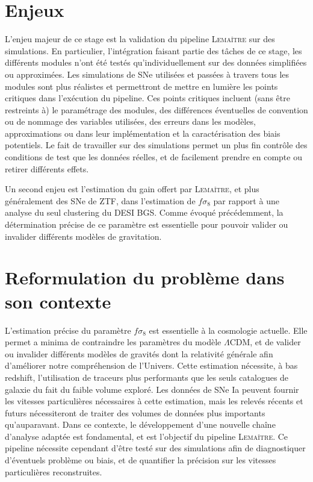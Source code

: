 \documentclass{book}
\def\lemaitre{\textsc{Lemaître}\xspace}
\begin{document}
\section{Enjeux}

L'enjeu majeur de ce stage est la validation du pipeline \lemaitre sur des simulations. En particulier, l'intégration faisant partie des tâches de ce stage, les différents modules n'ont été testés qu'individuellement sur des données simplifiées ou approximées. Les simulations de SNe utilisées et passées à travers tous les modules sont plus réalistes et permettront de mettre en lumière les points critiques dans l'exécution du pipeline. Ces points critiques incluent (sans être restreints à) le paramétrage des modules, des différences éventuelles de convention ou de nommage des variables utilisées, des erreurs dans les modèles, approximations ou dans leur implémentation et la caractérisation des biais potentiels.
Le fait de travailler sur des simulations permet un plus fin contrôle des conditions de test que les données réelles, et de facilement prendre en compte ou retirer différents effets.

Un second enjeu est l'estimation du gain offert par \lemaitre, et plus généralement des SNe de ZTF, dans l'estimation de $f\sigma_8$ par rapport à une analyse du seul clustering du DESI BGS. Comme évoqué précédemment, la détermination précise de ce paramètre est essentielle pour pouvoir valider ou invalider différents modèles de gravitation.

\section{Reformulation du problème dans son contexte}

L'estimation précise du paramètre $f\sigma_8$ est essentielle à la cosmologie actuelle. Elle permet a minima de contraindre les paramètres du modèle $\Lambda$CDM, et de valider ou invalider différents modèles de gravités dont la relativité générale afin d'améliorer notre compréhension de l'Univers. Cette estimation nécessite, à bas redshift, l'utilisation de traceurs plus performants que les seuls catalogues de galaxie du fait du faible volume exploré. Les données de SNe Ia peuvent fournir les vitesses particulières nécessaires à cette estimation, mais les relevés récents et futurs nécessiteront de traiter des volumes de données plus importants qu'auparavant. Dans ce contexte, le développement d'une nouvelle chaîne d'analyse adaptée est fondamental, et est l'objectif du pipeline \lemaitre. Ce pipeline nécessite cependant d'être testé sur des simulations afin de diagnostiquer d'éventuels problème ou biais, et de quantifier la précision sur les vitesses particulières reconstruites.
\end{document}
